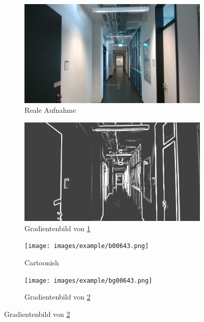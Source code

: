 \vspace{\fill}
\begin{figure}[htp]
	\centering
	\begin{subfigure}[b]{0.48\linewidth}
		\centering
		\includegraphics[width=\linewidth]{images/example/r000305.png}
		\caption{Reale Aufnahme}
		\label{subfig:real}
	\end{subfigure}
	\hfill
	\begin{subfigure}[b]{0.48\linewidth}
		\centering
		\includegraphics[width=\linewidth]{images/example/rg000305.png}
		\caption{Gradientenbild von \ref{subfig:real}}
	\end{subfigure}
	\hfill
	\begin{subfigure}[b]{0.48\linewidth}
		\centering
		\texttt{[image: images/example/b00643.png]}
		\caption{Cartoonish}
		\label{subfig:cartoonish}
	\end{subfigure}
	\hfill
	\begin{subfigure}[b]{0.48\linewidth}
		\centering
		\texttt{[image: images/example/bg00643.png]}
		\caption{Gradientenbild von \ref{subfig:cartoonish}}
	\end{subfigure}

\end{figure}
